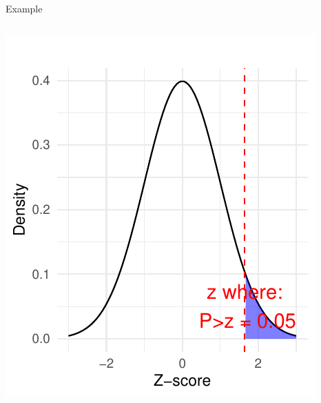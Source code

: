 \documentclass[
  ignorenonframetext,
]{beamer}
\begin{document}
\begin{frame}[fragile]{Example}
\begin{columns}[T]
\begin{column}{0.5\textwidth}
\includegraphics{M5-Hypothesis-Testing,-Probability-and-Distribution_files/figure-beamer/unnamed-chunk-21-1.pdf}
\end{column}
\end{columns}
\end{frame}
\end{document}
